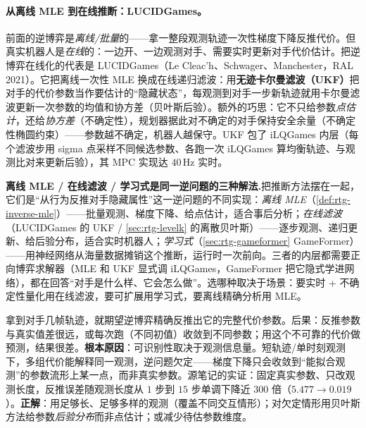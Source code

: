 \paragraph{从离线 MLE 到在线推断：LUCIDGames。}
前面的逆博弈是\emph{离线/批量}的——拿一整段观测轨迹一次性梯度下降反推代价。但真实机器人是\emph{在线}的：一边开、一边观测对手、需要实时更新对手代价估计。把逆博弈在线化的代表是 LUCIDGames（Le Cleac'h、Schwager、Manchester，RAL 2021）\cite{lecleach2021lucidgames}。它把离线一次性 MLE 换成在线递归滤波：用\textbf{无迹卡尔曼滤波（UKF）}把对手的代价参数当作要估计的“隐藏状态”，每观测到对手一步新轨迹就用卡尔曼滤波更新一次参数的均值和协方差（贝叶斯后验）。额外的巧思：它不只给参数\emph{点估计}，还给\emph{协方差}（不确定性），规划器据此对不确定的对手保持安全余量（不确定性椭圆约束）——参数越不确定，机器人越保守。UKF 包了 iLQGames 内层（每个滤波步用 sigma 点采样不同候选参数、各跑一次 iLQGames 算均衡轨迹、与观测比对来更新后验），其 MPC 实现达 $40$\,Hz 实时\cite{lecleach2021lucidgames}。

\begin{insight}
\textbf{离线 MLE / 在线滤波 / 学习式是同一逆问题的三种解法.}\;把推断方法摆在一起，它们是“从行为反推对手隐藏属性”这一逆问题的不同实现：\emph{离线 MLE}（\cref{def:rtg-inverse-mle}）——批量观测、梯度下降、给点估计，适合事后分析；\emph{在线滤波}（LUCIDGames 的 UKF / \cref{sec:rtg-levelk} 的离散贝叶斯）——逐步观测、递归更新、给后验分布，适合实时机器人；\emph{学习式}（\cref{sec:rtg-gameformer} GameFormer）——用神经网络从海量数据摊销这个推断，运行时一次前向。三者的内层都需要正向博弈求解器（MLE 和 UKF 显式调 iLQGames，GameFormer 把它隐式学进网络），都在回答“对手是什么样、它会怎么做”。选哪种取决于场景：要实时 + 不确定性量化用在线滤波，要可扩展用学习式，要离线精确分析用 MLE。
\end{insight}

\begin{pitfall}
拿到对手几帧轨迹，就期望逆博弈精确反推出它的完整代价参数。后果：反推参数与真实值差很远，或每次跑（不同初值）收敛到不同参数；用这个不可靠的代价做预测，结果很差。\textbf{根本原因}：可识别性取决于观测信息量。短轨迹/单时刻观测下，多组代价能解释同一观测，逆问题欠定——梯度下降只会收敛到“能拟合观测”的参数流形上某一点，而非真实参数。源笔记的实证：固定真实参数、只改观测长度，反推误差随观测长度从 $1$ 步到 $15$ 步单调下降近 $300$ 倍（$5.477\to0.019$）\cite{peters2021inferring}。\textbf{正解}：用足够长、足够多样的观测（覆盖不同交互情形）；对欠定情形用贝叶斯方法给参数\emph{后验分布}而非点估计；或减少待估参数维度。
\end{pitfall}

